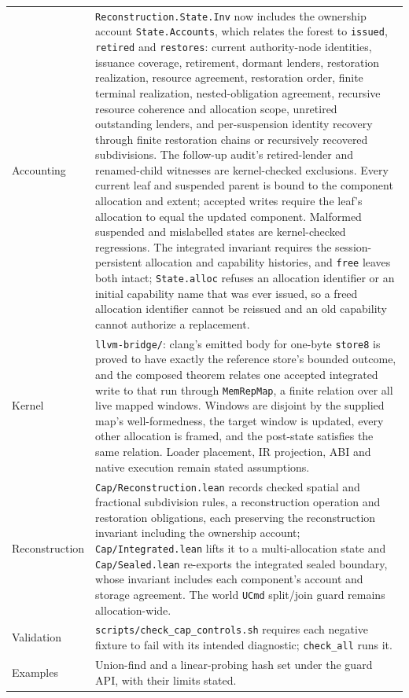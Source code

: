 \documentclass[10pt,a4paper]{article}
\newcommand{\file}[1]{\texttt{\small #1}}
\begin{document}
\begin{center}
\begin{tabular}{@{}lp{}@{}}
Accounting & \texttt{Reconstruction.State.Inv} now includes the ownership account \texttt{State.Accounts}, which relates the forest to \texttt{issued}, \texttt{retired} and \texttt{restores}: current authority-node identities, issuance coverage, retirement, dormant lenders, restoration realization, resource agreement, restoration order, finite terminal realization, nested-obligation agreement, recursive resource coherence and allocation scope, unretired outstanding lenders, and per-suspension identity recovery through finite restoration chains or recursively recovered subdivisions. The follow-up audit's retired-lender and renamed-child witnesses are kernel-checked exclusions. Every current leaf and suspended parent is bound to the component allocation and extent; accepted writes require the leaf's allocation to equal the updated component. Malformed suspended and mislabelled states are kernel-checked regressions. The integrated invariant requires the session-persistent allocation and capability histories, and \texttt{free} leaves both intact; \texttt{State.alloc} refuses an allocation identifier or an initial capability name that was ever issued, so a freed allocation identifier cannot be reissued and an old capability cannot authorize a replacement. \\
Kernel & \file{llvm-bridge/}: clang's emitted body for one-byte \texttt{store8} is proved to have exactly the reference store's bounded outcome, and the composed theorem relates one accepted integrated write to that run through \texttt{MemRepMap}, a finite relation over all live mapped windows. Windows are disjoint by the supplied map's well-formedness, the target window is updated, every other allocation is framed, and the post-state satisfies the same relation. Loader placement, IR projection, ABI and native execution remain stated assumptions. \\
Reconstruction & \file{Cap/Reconstruction.lean} records checked spatial and fractional subdivision rules, a reconstruction operation and restoration obligations, each preserving the reconstruction invariant including the ownership account; \file{Cap/Integrated.lean} lifts it to a multi-allocation state and \file{Cap/Sealed.lean} re-exports the integrated sealed boundary, whose invariant includes each component's account and storage agreement. The world \texttt{UCmd} split/join guard remains allocation-wide. \\
Validation & \texttt{scripts/check\_cap\_controls.sh} requires each negative fixture to fail with its intended diagnostic; \texttt{check\_all} runs it. \\
Examples & Union-find and a linear-probing hash set under the guard API, with their limits stated. \\
\bottomrule
\end{tabular}
\end{center}
\end{document}
